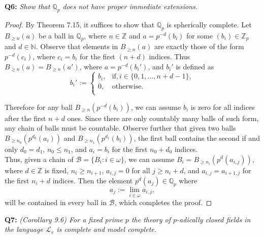 \documentclass{article}
\begin{document}
\textbf{Q6:} \it Show that $\mathbb{Q}_p$ does not have proper immediate
  extensions.
  \begin{proof}
    By Theorem 7.15, it suffices to show that $\mathbb{Q}_p$ is spherically
    complete. Let $B_{\geq n}(a)$ be a ball in $\mathbb{Q}_p$, where
    $n\in\mathbb{Z}$ and $a=p^{-d}(b_i)$ for some $(b_i)\in\mathbb{Z}_p$
    and $d\in\mathbb{N}$. Observe that elements in $B_{\geq n}(a)$ are
    exactly those of the form $p^{-d}(c_i)$, where $c_i=b_i$ for the first
    $(n+d)$ indices. Thus $B_{\geq n}(a)=B_{\geq n}(a')$, where
    $a=p^{-d}(b_i')$, and $b_i'$ is defined as
    \begin{equation*}
      b_i':=
      \begin{cases}
        b_i, &\text{if}, i\in\{0,1,\ldots,n+d-1\},\\
        0, &\text{otherwise}.\\
      \end{cases}
    \end{equation*}

    Therefore for any ball $B_{\geq n}(p^{-d}(b_i))$, we can assume $b_i$
    is zero for all indices after the first $n+d$ ones. Since there are
    only countably many balls of such form, any chain of balls must be
    countable. Observe further that given two balls $B_{\geq
    n_0}(p^{d_0}(a_i))$ and $B_{\geq n_1}(p^{d_1}(b_i))$, the first ball
    contains the second if and only $d_0=d_1$, $n_0\leq n_1$, and $a_i=b_i$
    for the first $n_0+d_0$ indices. \\

    Thus, given a chain of $\mathcal{B}=\{B_i:i\in\omega\}$, we can assume
    $B_i=B_{\geq n_i}(p^d(a_{i,j}))$, where $d\in\mathbb{Z}$ is fixed,
    $n_i\geq n_{i+1}$, $a_{i,j}=0$ for all $j\geq n_i+d$, and
    $a_{i,j}=a_{i+1,j}$ for the first $n_i+d$ indices. Then the element
    $p^d(a_j)\in\mathbb{Q}_p$ where
    \[a_j :=\lim_{i\in\omega} a_{i,j},\]
    will be contained in every ball in $\mathcal{B}$, which completes the
    proof.
  \end{proof}

\textbf{Q7:} \it (Corollary 9.6) For a fixed prime $p$ the theory of
  $p$-adically closed fields in the language $\mathcal{L}_v$ is complete
  and model complete.
\end{document}
